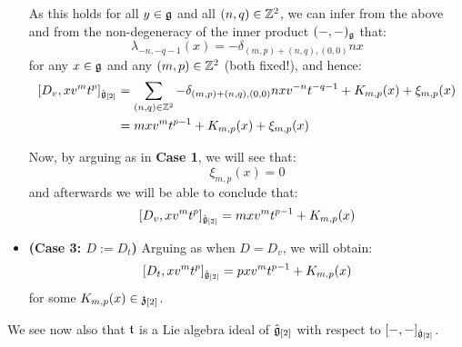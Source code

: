 \begin{remark}
\begin{itemize}
                    As this holds for all $y \in \mathfrak{g}$ and all $(n, q) \in \mathbb{Z}^2$, we can infer from the above and from the non-degeneracy of the inner product $(-, -)_{\mathfrak{g}}$ that:
                        $$\lambda_{-n, -q - 1}(x) = -\delta_{(m, p) + (n, q), (0, 0)} n x$$
                    for any $x \in \mathfrak{g}$ and any $(m, p) \in \mathbb{Z}^2$ (both fixed!), and hence:
                        $$
                            \begin{aligned}
                                [D_v, x v^m t^p]_{\hat{\g}_{[2]}} & = \sum_{(n, q) \in \Z^2} -\delta_{(m, p) + (n, q), (0, 0)} n x v^{-n} t^{-q - 1} + K_{m, p}(x) + \xi_{m, p}(x)
                                \\
                                & = m x v^m t^{p - 1} + K_{m, p}(x) + \xi_{m, p}(x)
                            \end{aligned}
                        $$

                    Now, by arguing as in \textbf{Case 1}, we will see that:
                        $$\xi_{m, p}(x) = 0$$
                    and afterwards we will be able to conclude that:
                        $$[D_v, x v^m t^p]_{\hat{\mathfrak{g}}_{[2]}} = m x v^m t^{p - 1} + K_{m, p}(x)$$
                    \item \textbf{(Case 3: $D := D_t$)} Arguing as when $D = D_v$, we will obtain:
                        $$[D_t, x v^m t^p]_{\hat{\mathfrak{g}}_{[2]}} = p x v^m t^{p - 1} + K_{m, p}(x)$$
                    for some $K_{m, p}(x) \in \mathfrak{z}_{[2]}$.
                \end{itemize}
            \end{remark}
            \begin{remark}
                We see now also that $\mathfrak{t}$ is a Lie algebra ideal of $\hat{\mathfrak{g}}_{[2]}$ with respect to $[-, -]_{\hat{\mathfrak{g}}_{[2]}}$.
            \end{remark}

